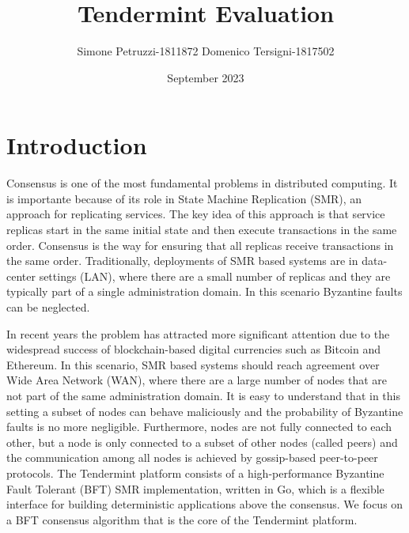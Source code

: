 \documentclass{article}
\title{Tendermint Evaluation}
\author{Simone Petruzzi-1811872 Domenico Tersigni-1817502}
\date{September 2023}
\begin{document}
   \maketitle
   \section{Introduction}
  Consensus is one of the most fundamental problems in distributed computing. It is importante because of its role in State Machine Replication (SMR), an approach for replicating services. The key idea of this approach is that service replicas start in the same initial state and then execute transactions in the same order. Consensus is the way for ensuring that all replicas receive transactions in the same order.
Traditionally, deployments of SMR based systems are in data-center settings (LAN), where there are a small number of replicas and they are typically part of a single administration domain. In this scenario Byzantine faults can be neglected. 

In recent years the problem has attracted more significant attention due to the widespread success of blockchain-based digital currencies such as Bitcoin and Ethereum. In this scenario, SMR based systems should reach agreement over Wide Area Network (WAN), where there are a large number of nodes that are not part of the same administration domain. It is easy to understand that in this setting a subset of nodes can behave maliciously and the probability of Byzantine faults is no more negligible.
Furthermore, nodes are not fully connected to each other, but a node is only connected to a subset of other nodes (called peers) and the communication among all nodes is achieved by gossip-based peer-to-peer protocols.
\newline
\newline
The Tendermint platform consists of a high-performance Byzantine Fault Tolerant (BFT) SMR implementation, written in Go, which is a flexible interface for building deterministic applications above the consensus.  We focus on a BFT consensus algorithm that is the core of the Tendermint platform. 
\end{document}
